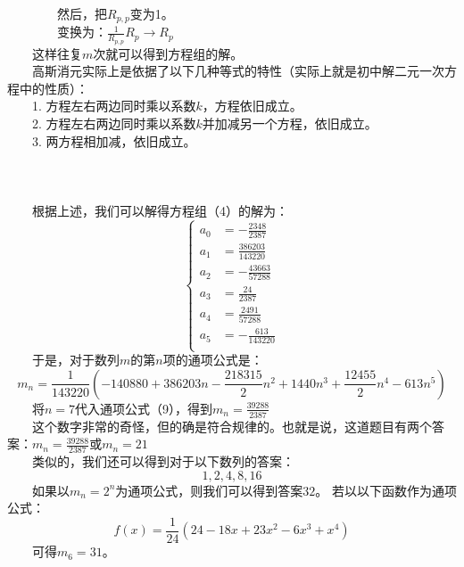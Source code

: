 \documentclass[12pt]{article}
\begin{document}
            　　　　然后，把$R_{p,p}$变为1。\\
            　　　　变换为：$\frac{1}{R_{p,p}}R_{p}\rightarrow{}R_{p}$\\
            　　这样往复$m$次就可以得到方程组的解。\\
            　　高斯消元实际上是依据了以下几种等式的特性（实际上就是初中解二元一次方程中的性质）：\\
            　　1. 方程左右两边同时乘以系数$k$，方程依旧成立。\\
            　　2. 方程左右两边同时乘以系数$k$并加减另一个方程，依旧成立。\\
            　　3. 两方程相加减，依旧成立。\\
\\
\\
\\
        　　根据上述，我们可以解得方程组（4）的解为：
        \begin{equation}
          \left\{
            \begin{aligned}
              a_{0}&=-\frac{2348}{2387}\\
              a_{1}&=\frac{386203}{143220}\\
              a_{2}&=-\frac{43663}{57288}\\
              a_{3}&=\frac{24}{2387}\\
              a_{4}&=\frac{2491}{57288}\\
              a_{5}&=-\frac{613}{143220}\\
            \end{aligned}
          \right.
        \end{equation}
        　　于是，对于数列$m$的第$n$项的通项公式是：\\
        \begin{equation}
          m_{n}=\frac{1}{143220}(-140880+386203n-\frac{218315}{2}n^{2}+1440n^{3}+\frac{12455}{2}n^{4}-613n^{5})
        \end{equation}
        　　将$n=7$代入通项公式（9），得到$m_{n}=\frac{39288}{2387}$\\
        　　这个数字非常的奇怪，但的确是符合规律的。也就是说，这道题目有两个答案：$m_{n}=\frac{39288}{2387}$或$m_{n}=21$\\
        　　类似的，我们还可以得到对于以下数列的答案：
        \begin{equation}
          1, 2, 4, 8, 16
        \end{equation}
        　　如果以$m_{n}=2^{n}$为通项公式，则我们可以得到答案$32$。
        若以以下函数作为通项公式：
        \begin{equation}
          f(x)=\frac{1}{24}(24-18x+23x^{2}-6x^{3}+x^{4})
        \end{equation}
        　　可得$m_{6}=31$。
\end{document}
